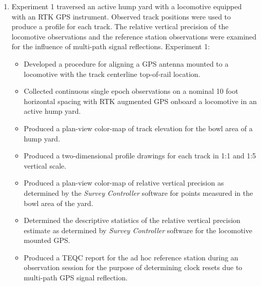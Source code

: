 \begin{enumerate} 
\item Experiment 1 traversed an active hump yard with a locomotive equipped with an RTK GPS instrument. Observed track positions were used to produce a profile for each track. The relative vertical precision of the locomotive observations and the reference station observations were examined for the influence of multi-path signal reflections. Experiment 1:

\begin{itemize}
	\item Developed a procedure for aligning a GPS antenna mounted to a locomotive with the track  centerline top-of-rail location.
	\item  Collected continuous single epoch observations on a nominal 10 foot horizontal spacing with RTK augmented GPS onboard a locomotive in an active hump yard. 
	\item Produced a plan-view color-map of track elevation for the bowl area of a hump yard.
	\item Produced a two-dimensional profile drawings for each track in 1:1 and 1:5 vertical scale.
	\item Produced a plan-view color-map of relative vertical precision as determined by the \emph{Survey Controller} software for points measured in the bowl area of the yard.
	\item Determined the descriptive statistics of the relative vertical precision estimate as determined by \emph{Survey Controller} software for the locomotive mounted GPS.
	\item Produced a TEQC report for the ad hoc reference station during an observation session for the purpose of determining clock resets due to multi-path GPS signal reflection.
\end{itemize}


\end{enumerate}
